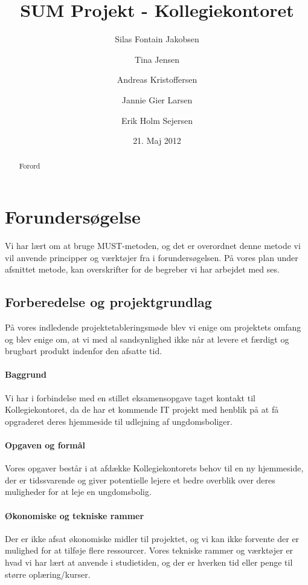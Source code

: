 \documentclass[12pt, a4paper]{report}
\title{SUM Projekt - Kollegiekontoret}
\author{Silas Fontain Jakobsen \and Tina Jensen \and Andreas Kristoffersen \and Jannie Gier Larsen \and Erik Holm Sejersen}
\date{21. Maj 2012}
\begin{document}
\begin{titlepage}
\maketitle
\end{titlepage}

\begin{abstract}
\thispagestyle{empty}
Forord
\end{abstract}

\tableofcontents

\chapter{Forundersøgelse}


Vi har lært om at bruge MUST-metoden, og det er overordnet denne metode vi vil anvende principper og værktøjer fra i forundersøgelsen. På vores plan under afsnittet metode, kan overskrifter for de begreber vi har arbejdet med ses.

\section{Forberedelse og projektgrundlag}
På vores indledende projektetableringsmøde blev vi enige om projektets omfang og blev enige om, at vi med al sandsynlighed ikke når at levere et færdigt og brugbart produkt indenfor den afsatte tid.

\subsubsection{Baggrund}
Vi har i forbindelse med en stillet eksamensopgave taget kontakt til Kollegiekontoret, da de har et kommende IT projekt med henblik på at få opgraderet deres hjemmeside til udlejning af ungdomsboliger.

\subsubsection{Opgaven og formål}
Vores opgaver består i at afdække Kollegiekontorets behov til en ny hjemmeside, der er tidssvarende og giver potentielle lejere et bedre overblik over deres muligheder for at leje en ungdomsbolig.

\subsubsection{Økonomiske og tekniske rammer}
Der er ikke afsat økonomiske midler til projektet, og vi kan ikke forvente der er mulighed for at tilføje flere ressourcer. Vores tekniske rammer og værktøjer er hvad vi har lært at anvende i studietiden, og der er hverken tid eller penge til større oplæring/kurser.
\end{document}
